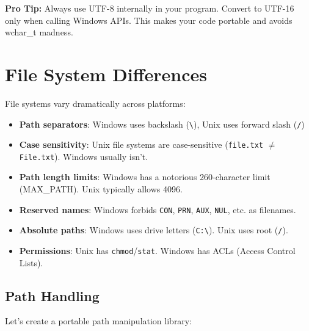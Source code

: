\begin{tipbox}
\textbf{Pro Tip:} Always use UTF-8 internally in your program. Convert to UTF-16 only when calling Windows APIs. This makes your code portable and avoids wchar\_t madness.
\end{tipbox}

\section{File System Differences}

File systems vary dramatically across platforms:

\begin{itemize}
    \item \textbf{Path separators}: Windows uses backslash (\texttt{\textbackslash}), Unix uses forward slash (\texttt{/})
    \item \textbf{Case sensitivity}: Unix file systems are case-sensitive (\texttt{file.txt} $\neq$ \texttt{File.txt}). Windows usually isn't.
    \item \textbf{Path length limits}: Windows has a notorious 260-character limit (MAX\_PATH). Unix typically allows 4096.
    \item \textbf{Reserved names}: Windows forbids \texttt{CON}, \texttt{PRN}, \texttt{AUX}, \texttt{NUL}, etc. as filenames.
    \item \textbf{Absolute paths}: Windows uses drive letters (\texttt{C:\textbackslash}). Unix uses root (\texttt{/}).
    \item \textbf{Permissions}: Unix has \texttt{chmod}/\texttt{stat}. Windows has ACLs (Access Control Lists).
\end{itemize}

\subsection{Path Handling}

Let's create a portable path manipulation library:


